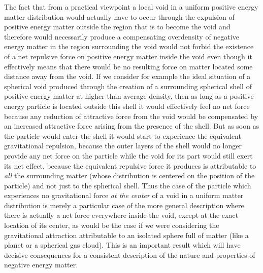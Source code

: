 \documentclass[notitlepage,12pt]{report}
\begin{document}
The fact that from a practical viewpoint a local void in a uniform positive energy matter distribution would actually have to occur through the expulsion of positive energy matter outside the region that is to become the void and therefore would necessarily produce a compensating overdensity of negative energy matter in the region surrounding the void would not forbid the existence of a net repulsive force on positive energy matter inside the void even though it effectively means that there would be no resulting force on matter located some distance away from the void. If we consider for example the ideal situation of a spherical void produced through the creation of a surrounding spherical shell of positive energy matter at higher than average density, then as long as a positive energy particle is located outside this shell it would effectively feel no net force because any reduction of attractive force from the void would be compensated by an increased attractive force arising from the presence of the shell. But as soon as the particle would enter the shell it would start to experience the equivalent gravitational repulsion, because the outer layers of the shell would no longer provide any net force on the particle while the void for its part would still exert its net effect, because the equivalent repulsive force it produces is attributable to \textit{all} the surrounding matter (whose distribution is centered on the position of the particle) and not just to the spherical shell. Thus the case of the particle which experiences no gravitational force \textit{at the center} of a void in a uniform matter distribution is merely a particular case of the more general description where there is actually a net force everywhere inside the void, except at the exact location of its center, as would be the case if we were considering the gravitational attraction attributable to an isolated sphere full of matter (like a planet or a spherical gas cloud). This is an important result which will have decisive consequences for a consistent description of the nature and properties of negative energy matter.

\bigskip
\end{document}
